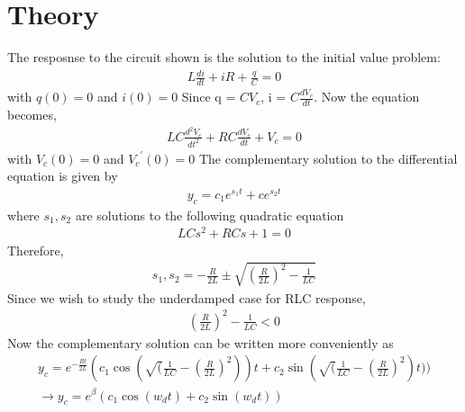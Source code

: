 \documentclass[a4paper,12pt]{article}
\begin{document}
\section{Theory}
\begin{figure}[!ht]
\centering
{}%
\label{fig:my_label}
\end{figure}
The resposnse to the circuit shown is the solution to the initial value problem:
\begin{align}
  L\frac{di}{dt} + iR + \frac{q}{C} = 0
\end{align}
with $q(0) = 0$ and $i(0) = 0$
\newline
Since q = $CV_c$, i = $C\frac{dV_c}{dt}$. Now the equation becomes,
\begin{align}
  LC\frac{d^2V_c}{dt^2} + RC\frac{dV_c}{dt} + V_c = 0 
\end{align}
with $V_c(0) = 0$ and ${V_c}^{\prime}(0) = 0$ 
\newline
The complementary solution to the differential equation is given by 
\begin{align}
  y_c = c_1e^{s_1t} + ce^{s_2t}
\end{align}
where $s_1, s_2$ are solutions to the following quadratic equation
\begin{align}
  LCs^2 + RCs + 1 = 0
\end{align}
Therefore,
\begin{align}
  s_1, s_2 = -\frac{R}{2L} \pm \sqrt{(\frac{R}{2L})^2 - \frac{1}{LC}}
\end{align}
Since we wish to study the underdamped case for RLC response, 
\begin{align}
  (\frac{R}{2L})^2 - \frac{1}{LC} < 0
\end{align}
Now the complementary solution can be written more conveniently as
\begin{align}
  y_c = e^{-\frac{Rt}{2L}}(c_1 \cos(\sqrt(\frac{1}{LC} - (\frac{R}{2L})^2))t  +  c_2 \sin(\sqrt(\frac{1}{LC} - (\frac{R}{2L})^2)t))\\
  \rightarrow y_c = e^{\beta}(c_1 \cos(w_d t) + c_2 \sin(w_d t))
\end{align}
\end{document}
